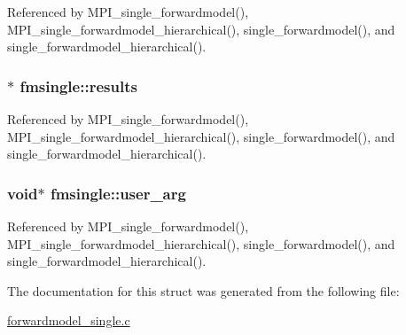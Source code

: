 Referenced by M\+P\+I\+\_\+single\+\_\+forwardmodel(), M\+P\+I\+\_\+single\+\_\+forwardmodel\+\_\+hierarchical(), single\+\_\+forwardmodel(), and single\+\_\+forwardmodel\+\_\+hierarchical().

\subsubsection[{\texorpdfstring{results}{results}}]{$\ast$ fmsingle\+::results}\hypertarget{structfmsingle_a7264d52b1fa07698c747ce50c9b81553}{}\label{structfmsingle_a7264d52b1fa07698c747ce50c9b81553}


Referenced by M\+P\+I\+\_\+single\+\_\+forwardmodel(), M\+P\+I\+\_\+single\+\_\+forwardmodel\+\_\+hierarchical(), single\+\_\+forwardmodel(), and single\+\_\+forwardmodel\+\_\+hierarchical().

\subsubsection[{\texorpdfstring{user\+\_\+arg}{user_arg}}]{\setlength{\rightskip}{0pt plus 5cm}void$\ast$ fmsingle\+::user\+\_\+arg}\hypertarget{structfmsingle_afdda5c6d655200456d36d1db08bfc98e}{}\label{structfmsingle_afdda5c6d655200456d36d1db08bfc98e}


Referenced by M\+P\+I\+\_\+single\+\_\+forwardmodel(), M\+P\+I\+\_\+single\+\_\+forwardmodel\+\_\+hierarchical(), single\+\_\+forwardmodel(), and single\+\_\+forwardmodel\+\_\+hierarchical().



The documentation for this struct was generated from the following file\+:\begin{DoxyCompactItemize}
\item 
\hyperlink{forwardmodel__single_8c}{forwardmodel\+\_\+single.\+c}\end{DoxyCompactItemize}
